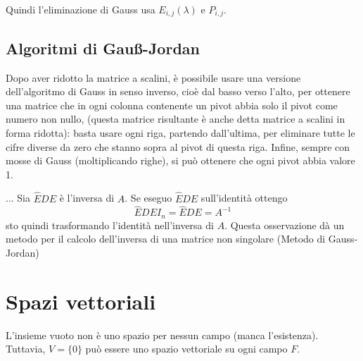 \documentclass[a4paper]{article}
\begin{document}
Quindi l'eliminazione di Gauss usa \(E_{i,j}(\lambda)\) e \(P_{i,j}\).

\subsection{Algoritmi di Gauß-Jordan}

Dopo aver ridotto la matrice a scalini, è possibile usare una versione dell'algoritmo di
Gauss in senso inverso, cioè dal basso verso l'alto,
per ottenere una matrice che in ogni colonna contenente un pivot abbia solo il pivot come
numero non nullo, (questa matrice risultante è anche detta matrice a scalini in forma ridotta):
basta usare ogni riga, partendo dall'ultima, per eliminare tutte le
cifre diverse da zero che stanno sopra al pivot di questa riga.
Infine, sempre con mosse di Gauss (moltiplicando righe),
si può ottenere che ogni pivot abbia valore 1.

... Sia \(\hat{E}DE\) è l'inversa di \(A\). Se eseguo \(\hat{E}DE\) sull'identità ottengo
\[
    \hat{E}DEI_n = \hat{E}DE = A^{-1}
\]
sto quindi trasformando l'identità nell'inversa di \(A\).
Questa osservazione dà un metodo per il calcolo dell'inversa di una matrice non singolare
(Metodo di Gauss-Jordan)



\section{Spazi vettoriali}

L'insieme vuoto non è uno spazio per nessun campo (manca l'esistenza).
Tuttavia, \(V = \{0\}\) può essere uno spazio vettoriale su ogni campo \(F\).

\end{document}
